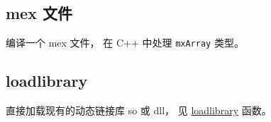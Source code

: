 
\begin{issues}
\issueDraft
\end{issues}

\subsection{mex 文件}
编译一个 mex 文件， 在 C++ 中处理 \verb`mxArray` 类型。 %

\subsection{loadlibrary}
直接加载现有的动态链接库 so 或 dll， 见 \href{https://www.mathworks.com/help/matlab/ref/loadlibrary.html}{loadlibrary} 函数。
